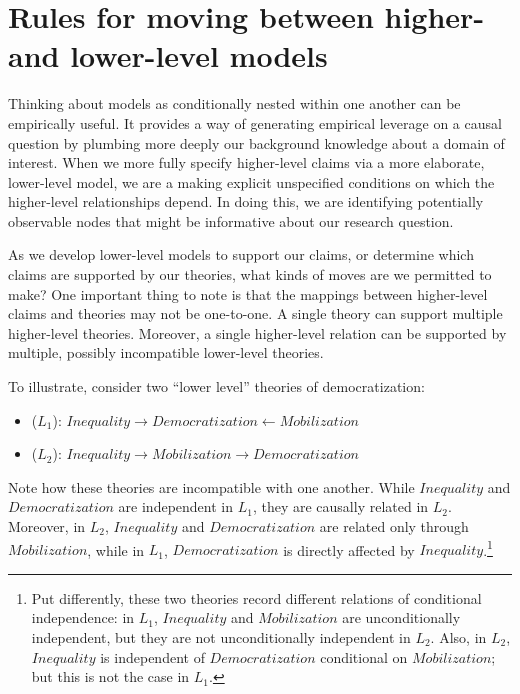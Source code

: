 \documentclass[
  12pt,
]{book}
\providecommand{\tightlist}{%
  \setlength{\itemsep}{0pt}\setlength{\parskip}{0pt}}
\begin{document}
\hypertarget{rules-for-moving-between-higher--and-lower-level-models}{%
\section{Rules for moving between higher- and lower-level models}\label{rules-for-moving-between-higher--and-lower-level-models}}

Thinking about models as conditionally nested within one another can be empirically useful. It provides a way of generating empirical leverage on a causal question by plumbing more deeply our background knowledge about a domain of interest. When we more fully specify higher-level claims via a more elaborate, lower-level model, we are a making explicit unspecified conditions on which the higher-level relationships depend. In doing this, we are identifying potentially observable nodes that might be informative about our research question.

As we develop lower-level models to support our claims, or determine which claims are supported by our theories, what kinds of moves are we permitted to make? One important thing to note is that the mappings between higher-level claims and theories may not be one-to-one. A single theory can support multiple higher-level theories. Moreover, a single higher-level relation can be supported by multiple, possibly incompatible lower-level theories.

To illustrate, consider two ``lower level'' theories of democratization:

\begin{itemize}
\tightlist
\item
  (\(L_1\)): \(Inequality \rightarrow Democratization \leftarrow Mobilization\)\\
\item
  (\(L_2\)): \(Inequality \rightarrow Mobilization \rightarrow Democratization\)
\end{itemize}

Note how these theories are incompatible with one another. While \(Inequality\) and \(Democratization\) are independent in \(L_1\), they are causally related in \(L_2\). Moreover, in \(L_2\), \(Inequality\) and \(Democratization\) are related only through \(Mobilization\), while in \(L_1\), \(Democratization\) is directly affected by \(Inequality\).\footnote{Put differently, these two theories record different relations of conditional independence: in \(L_1\), \(Inequality\) and \(Mobilization\) are unconditionally independent, but they are not unconditionally independent in \(L_2\). Also, in \(L_2\), \(Inequality\) is independent of \(Democratization\) conditional on \(Mobilization\); but this is not the case in \(L_1\).}
\end{document}
